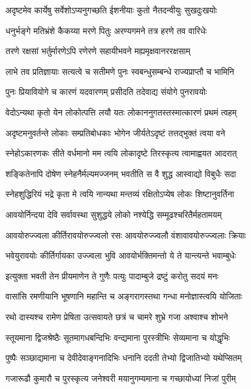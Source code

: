 \twolineshloka
{अदृष्टमेव कार्येषु सर्वेशोऽप्यनुगच्छति}
{ईशनीयाः कुतो नैतदन्वीयुः सुखदुःखयोः}%

\twolineshloka
{धनुर्भङ्गे मतिभ्रंशे कैकय्या मरणे पितुः}
{अरण्यगमने तत्र हरणे तव वारिधेः}%

\twolineshloka
{तरणे रक्षसां भर्तुर्मारणेऽपि रणेरणे}
{सहायीभवने मह्यमृक्षवानररक्षसाम्}%

\twolineshloka
{लाभे तव प्रतिज्ञायाः सत्यत्वे च सतीमणे}
{पुनः स्वबन्धुसम्बन्धे राज्यप्राप्तौ च भामिनि}%

\twolineshloka
{पुनः प्रियावियोगे च कारणं यदवारणम्}
{प्रसीदति तदेवाद्य संयोगे पुनरावयोः}%

\twolineshloka
{वेदोऽन्यथा कृतो येन लोकोत्पत्ति लयौ यतः}
{लोकाननुगतस्तस्मात्कारणं प्रथमं त्वहम्}%

\twolineshloka
{अदृष्टमनुवर्तन्ते लोकाः सम्प्रतिबोधकाः}
{भोगेन जीर्यतेऽदृष्टं तत्तद्भुक्तं त्वया वने}%

\twolineshloka
{स्नेहोऽकारणकः सीते वर्धमानो मम त्वयि}
{लोकादृष्टे तिरस्कृत्य त्वामाह्वयत आदरात्}%

\twolineshloka
{शङ्कितेनापि दोषेण स्नेहनैर्मल्यमज्जनम्}
{भवतीति स वै शुद्ध आस्वाद्यो विबुधैः सदा}%

\twolineshloka
{स्नेहशुद्धिरियं भद्रे कृता मे त्वयि नान्यथा}
{मन्तव्यं रक्षितोऽप्येष लोकः शिष्टानुवर्तिना}%

\twolineshloka
{आवयोर्निन्दया देवि सर्वावस्था सुशुद्धये}
{लोको नश्येद्धि सम्मूढश्चरितैर्महतामयम्}%

\twolineshloka
{आवयोरुज्ज्वला कीर्तिरावयोरुज्ज्वलो रसः}
{आवयोरुज्ज्वलौ वंशावावयोरुज्ज्वलाः क्रियाः}%

\twolineshloka
{भवेयुरावयोः कीर्तिर्गायका उज्ज्वला भुवि}
{आवयोर्भक्तिमन्तो ये ते यान्त्यन्ते भवाम्बुधेः}%

\twolineshloka
{इत्युक्ता भवती तेन प्रीयमाणेन ते गुणैः}
{पत्युः पादाम्बुजे द्रष्टुं करोतु सदयं मनः}%

\twolineshloka
{वासांसि रमणीयानि भूषणानि महान्ति च}
{अङ्गरागस्तथा गन्धा मनोज्ञास्त्वयि योजिताः}%

\twolineshloka
{रथो दास्यश्च रामेण प्रेषिता उत्सवायते}
{छत्रं च चामरे शुभ्रे गजा अश्वाश्च शोभने}%

\twolineshloka
{स्तूयमाना द्विजश्रेष्ठैः सूतमागधबन्दिभिः}
{वन्द्यमाना पुरस्त्रीभिः सेव्यमाना च योद्धृभिः}%

\twolineshloka
{पुष्पैः सञ्छाद्यमाना च देवीदेवाङ्गनादिभिः}
{धनानि ददती तेभ्यो द्विजातिभ्यो यथेप्सितम्}%

\twolineshloka
{गजारूढौ कुमारौ च पुरस्कृत्य जनेश्वरी}
{मयानुगम्यमाना च गच्छायोध्यां निजां पुरीम्}%

